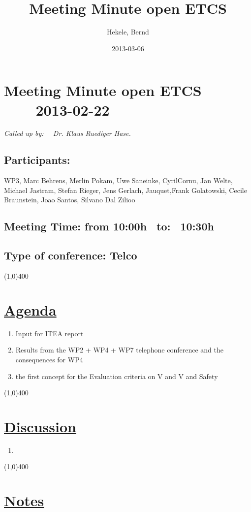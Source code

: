 \documentclass[a4paper]{article}
\title{Meeting Minute open ETCS}
\author{Hekele, Bernd}
\date{2013-03-06}
\begin{document}
\section*{\large{Meeting Minute open ETCS \ \ \ \ 2013-02-22}}

\large{\emph{Called up by: \ \  Dr. Klaus Ruediger Hase.}}

\subsection*{Participants:}WP3, Marc Behrens, Merlin Pokam, Uwe Saneinke, CyrilCornu, Jan Welte, Michael Jastram, Stefan Rieger, Jens Gerlach, Jauquet,Frank Golatowski, Cecile Braunstein,  Joao Santos, Silvano Dal Zilioo \\

\subsection*{Meeting Time: from 10:00h \ to: \ 10:30h}
\subsection*{Type of conference: Telco}

\line(1,0){400}
\section*{\underline{Agenda}}
\begin{enumerate}

\item Input for ITEA report
\item Results from the WP2 + WP4 + WP7 telephone conference and the consequences for WP4
\item the first concept for the Evaluation criteria on V and V and Safety 

\end{enumerate}
\line(1,0){400}
\section*{\underline{Discussion}}

\begin{enumerate}
\item 

\end{enumerate}

\line(1,0){400}
\section*{\underline{Notes}}
\end{document}

